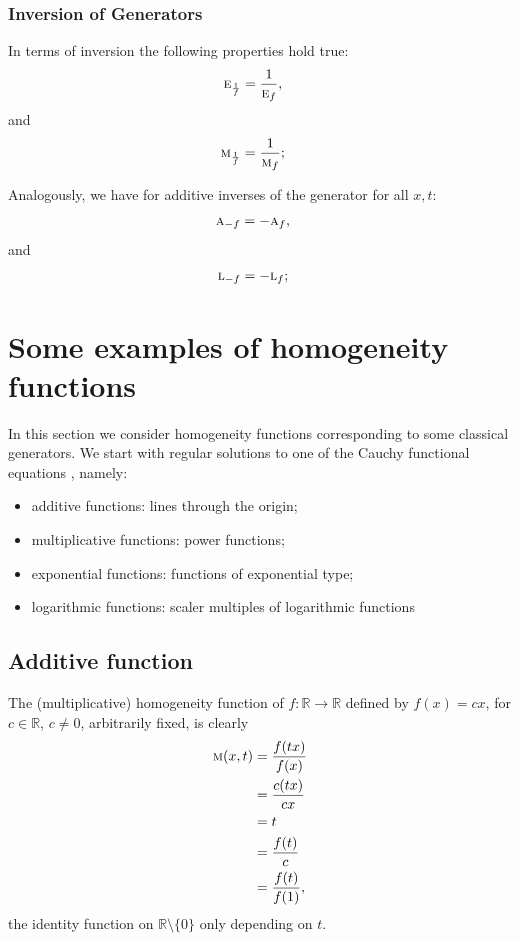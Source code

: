 \documentclass{amsart}
\makeatletter
\theoremstyle{plain}
\numberwithin{equation}{section}
\def\RIfM@{\relax\ifmmode}%
\def\RIfM@{\relax\protect\ifmmode}
\def\text{\RIfM@\expandafter\text@\else\expandafter\mbox\fi}
\def\text@#1{\mathchoice
   {\textdef@\displaystyle\f@size{#1}}%
   {\textdef@\textstyle\tf@size{\firstchoice@false #1}}%
   {\textdef@\textstyle\sf@size{\firstchoice@false #1}}%
   {\textdef@\textstyle \ssf@size{\firstchoice@false #1}}%
   \glb@settings}
\def\textdef@#1#2#3{\hbox{{%
                    \everymath{#1}%
                    \let\f@size#2\selectfont
                    #3}}}
\newif\iffirstchoice@
\newcommand{\mh}{\textsc{m}}
\newcommand{\ah}{\textsc{a}}
\newcommand{\lh}{\textsc{l}}
\newcommand{\eh}{\textsc{e}}
\newcommand{\R}{{\mathbb{R}}}
\makeatother
\begin{document}
\subsubsection{Inversion of Generators}
In terms of inversion the following properties hold true:
\begin{align*}
\eh_{\frac{1}{f}} &=
\frac{1}{\eh_{f}},
\end{align*}
and 
\begin{align*}
\mh_{\frac{1}{f}} &=
\frac{1}{\mh_{f}};
\end{align*}

Analogously, we have for additive inverses of the generator 
for all $x,t$:
\begin{align*}
\ah_{-{f}} &=
-\ah_{{f}},
\end{align*}
and \begin{align*}
\lh_{-{f}}&=
-\lh_{{f}};
\end{align*}



\section{Some examples of homogeneity functions}
In this section we consider homogeneity functions corresponding to some classical generators.
We start with regular solutions to one of the Cauchy functional equations \cite[128-130]{Kuczma2}, namely:
\begin{itemize}
\item 
 additive functions: lines through the origin;
\item 
multiplicative functions: power functions; 
\item 
exponential functions: functions of exponential type;
\item 
 logarithmic functions: scaler multiples of logarithmic functions
\end{itemize}


\subsection{Additive function}
The (multiplicative) homogeneity function of $f:\R \to \R$ defined by $f(x)=cx$, for $c\in\R$, $c\neq 0$, arbitrarily fixed,
is clearly
\begin{align*}
\textsc{m}(x,t)&=\frac{f(tx)}{f(x)}\\
&=\frac{c({tx})}{cx}\\
&=t\\
&= \frac{f(t)}{c}\\
&= \frac{f(t)}{f(1)}, %
\end{align*}
the identity function on $\R \setminus \{0\}$ only depending on $t$.
\end{document}

